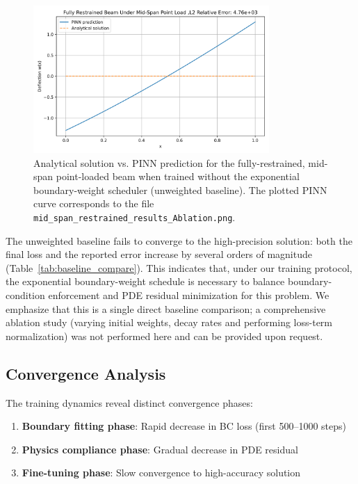 \documentclass[twocolumn]{svjour3}
\begin{document}
	\begin{figure}[t]
	    \centering
	    \includegraphics[width=0.8\textwidth]{mid_span_restrained_results_Ablation.png}
	    \caption{Analytical solution vs. PINN prediction for the fully-restrained, mid-span point-loaded beam when trained without the exponential boundary-weight scheduler (unweighted baseline). The plotted PINN curve corresponds to the file \texttt{mid\_span\_restrained\_results\_Ablation.png}.}
	    \label{fig:point_unweighted}
	\end{figure}
	
	The unweighted baseline fails to converge to the high-precision solution: both the final loss and the reported error increase by several orders of magnitude (Table~\ref{tab:baseline_compare}). This indicates that, under our training protocol, the exponential boundary-weight schedule is necessary to balance boundary-condition enforcement and PDE residual minimization for this problem. We emphasize that this is a single direct baseline comparison; a comprehensive ablation study (varying initial weights, decay rates and performing loss-term normalization) was not performed here and can be provided upon request.
	

	
	\subsection{Convergence Analysis}
	The training dynamics reveal distinct convergence phases:
	\begin{enumerate}
		\item \textbf{Boundary fitting phase}: Rapid decrease in BC loss (first 500--1000 steps)
		\item \textbf{Physics compliance phase}: Gradual decrease in PDE residual
		\item \textbf{Fine-tuning phase}: Slow convergence to high-accuracy solution
	\end{enumerate}
	
\end{document}
